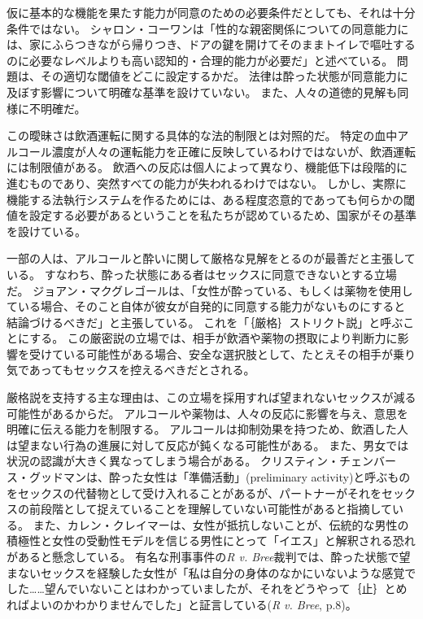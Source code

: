 \documentclass[paper=a4,book,openany]{jlreq}
\newcommand{\ig}[1]{}           %
\begin{document}
仮に基本的な機能を果たす能力が同意のための必要条件だとしても、それは十分条件ではない。
シャロン・コーワン\ig{Cowan}は「性的な親密関係についての同意能力には、家にふらつきながら帰りつき、ドアの鍵を開けてそのままトイレで嘔吐するのに必要なレベルよりも高い認知的・合理的能力が必要だ」と述べている\citep[p.919]{cowan08:_troub_drink}。
問題は、その適切な閾値をどこに設定するかだ。
法律は酔った状態が同意能力に及ぼす影響について明確な基準を設けていない。
また、人々の道徳的見解も同様に不明確だ。

この曖昧さは飲酒運転に関する具体的な法的制限とは対照的だ。
特定の血中アルコール濃度が人々の運転能力を正確に反映しているわけではないが、飲酒運転には制限値がある。
飲酒への反応は個人によって異なり、機能低下は段階的に進むものであり、突然すべての能力が失われるわけではない。
しかし、実際に機能する法執行システムを作るためには、ある程度恣意的であっても何らかの閾値を設定する必要があるということを私たちが認めているため、国家がその基準を設けている。

一部の人は、アルコールと酔いに関して厳格な見解をとるのが最善だと主張している。
すなわち、酔った状態にある者はセックスに同意できないとする立場だ。
ジョアン・マクグレゴール\ig{Joan MacGregor}は、「女性が酔っている、もしくは薬物を使用している場合、そのこと自体が彼女が自発的に同意する能力がないものにすると結論づけるべきだ」と主張している\citep[pp.244--245]{macgregor94:_force_consen_reason_woman}。
これを「｛厳格｝{ストリクト}説」と呼ぶことにする。
この厳密説の立場では、相手が飲酒や薬物の摂取により判断力に影響を受けている可能性がある場合、安全な選択肢として、たとえその相手が乗り気であってもセックスを控えるべきだとされる。

厳格説を支持する主な理由は、この立場を採用すれば望まれないセックスが減る可能性があるからだ。
アルコールや薬物は、人々の反応に影響を与え、意思を明確に伝える能力を制限する\citep{koss89:_discr_analy_risk_factor_sexual}。
アルコールは抑制効果を持つため、飲酒した人は望まない行為の進展に対して反応が鈍くなる可能性がある。
また、男女では状況の認識が大きく異なってしまう場合がある。
クリスティン・チェンバース・グッドマン\ig{Christine Chambers Goodman}は、酔った女性は「準備活動」(preliminary activity)と呼ぶものをセックスの代替物として受け入れることがあるが、パートナーがそれをセックスの前段階として捉えていることを理解していない可能性があると指摘している\citep[p.79]{goodman09:_protec_party_girl}。
また、カレン・クレイマーは、女性が抵抗しないことが、伝統的な男性の積極性と女性の受動性モデルを信じる男性にとって「イエス」と解釈される恐れがあると懸念している\citep[p.121]{kramer94:_rule_myth}。
有名な刑事事件の\emph{R v. Bree}裁判では、酔った状態で望まないセックスを経験した女性が「私は自分の身体のなかにいないような感覚でした……望んでいないことはわかっていましたが、それをどうやって｛止｝{と}めればよいのかわかりませんでした」と証言している(\emph{R v. Bree}, p.8)。
\end{document}
